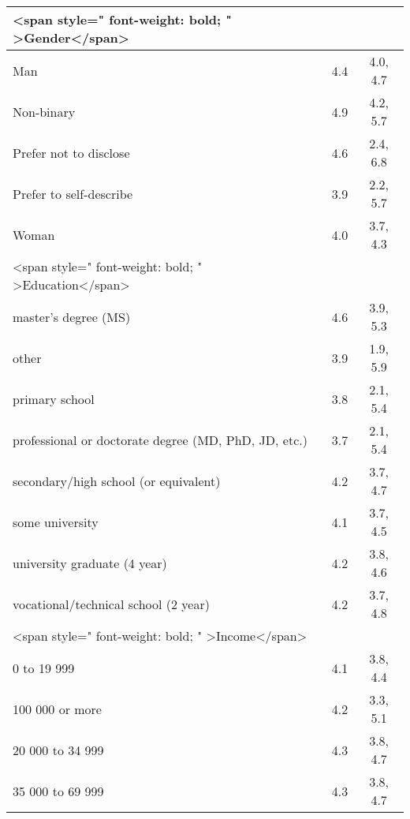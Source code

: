 \documentclass[border=1mm]{standalone}
\begin{document}
\begin{tabular}{l|c|c}
\hline
<span style=" font-weight: bold;    " >Gender</span> &  & \\
\hline
\hspace{1em}Man & 4.4 & 4.0, 4.7\\
\hline
\hspace{1em}Non-binary & 4.9 & 4.2, 5.7\\
\hline
\hspace{1em}Prefer not to disclose & 4.6 & 2.4, 6.8\\
\hline
\hspace{1em}Prefer to self-describe & 3.9 & 2.2, 5.7\\
\hline
\hspace{1em}Woman & 4.0 & 3.7, 4.3\\
\hline
<span style=" font-weight: bold;    " >Education</span> &  & \\
\hline
\hspace{1em}master's degree (MS) & 4.6 & 3.9, 5.3\\
\hline
\hspace{1em}other & 3.9 & 1.9, 5.9\\
\hline
\hspace{1em}primary school & 3.8 & 2.1, 5.4\\
\hline
\hspace{1em}professional or doctorate degree (MD, PhD, JD, etc.) & 3.7 & 2.1, 5.4\\
\hline
\hspace{1em}secondary/high school (or equivalent) & 4.2 & 3.7, 4.7\\
\hline
\hspace{1em}some university & 4.1 & 3.7, 4.5\\
\hline
\hspace{1em}university graduate (4 year) & 4.2 & 3.8, 4.6\\
\hline
\hspace{1em}vocational/technical school (2 year) & 4.2 & 3.7, 4.8\\
\hline
<span style=" font-weight: bold;    " >Income</span> &  & \\
\hline
\hspace{1em}0 to 19 999 & 4.1 & 3.8, 4.4\\
\hline
\hspace{1em}100 000 or more & 4.2 & 3.3, 5.1\\
\hline
\hspace{1em}20 000 to 34 999 & 4.3 & 3.8, 4.7\\
\hline
\hspace{1em}35 000 to 69 999 & 4.3 & 3.8, 4.7\\

\end{tabular}
\end{document}
